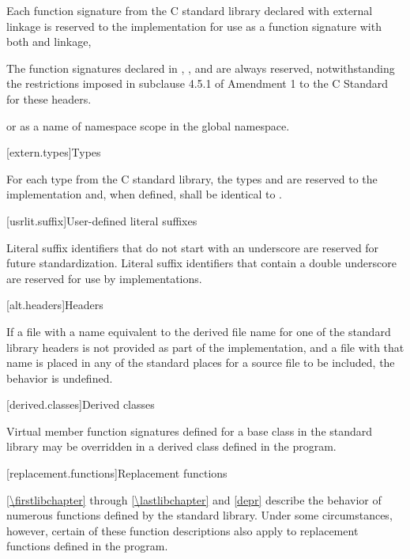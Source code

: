 \pnum
Each function signature from the C standard library declared with
%
external linkage
is reserved to the implementation for use as
a function signature with both
%
and
%
linkage,
\begin{footnote}
The function signatures declared in
%
,
,
and
are always reserved, notwithstanding the restrictions imposed in subclause
4.5.1 of Amendment 1 to the C Standard for these headers.
\end{footnote}
or as a name of namespace scope in the global namespace.

[extern.types]{Types}

\pnum
For each type  from the C standard library,
the types
and
are reserved to the implementation and, when defined,
shall be identical to
.

[usrlit.suffix]{User-defined literal suffixes}

\pnum
Literal suffix identifiers that do not start with an underscore are reserved for future standardization.
Literal suffix identifiers that contain a double underscore
\tcode{\unun}
%
are reserved for use by \Cpp{} implementations.

[alt.headers]{Headers}

\pnum
If a file with a name
equivalent to the derived file name for one of the \Cpp{} standard library headers
is not provided as part of the implementation, and a file with that name
is placed in any of the standard places for a source file to be included,
the behavior is undefined.%
%

[derived.classes]{Derived classes}

\pnum
Virtual member function signatures defined
%
for a base class in the \Cpp{} standard
%
%
library may be overridden in a derived class defined in the program.

[replacement.functions]{Replacement functions}

\pnum
{}%
\ref{\firstlibchapter} through \ref{\lastlibchapter} and \ref{depr}
describe the behavior of numerous functions defined by
the \Cpp{} standard library.
Under some circumstances,
%
however, certain of these function descriptions also apply to replacement functions defined
in the program.

